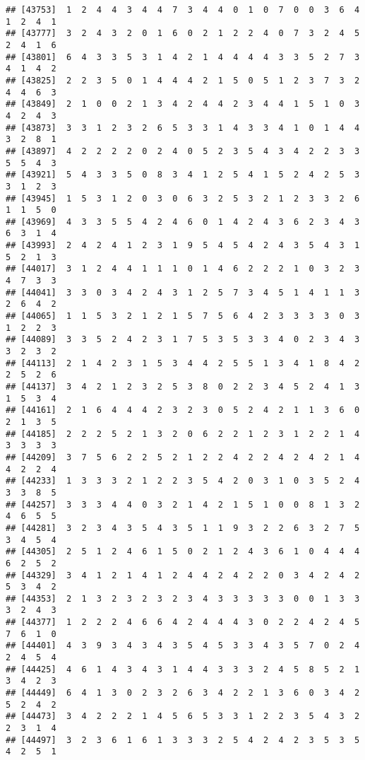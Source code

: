 \documentclass[
]{article}
\begin{document}
\begin{verbatim}
## [43753]  1  2  4  4  3  4  4  7  3  4  4  0  1  0  7  0  0  3  6  4  1  2  4  1
## [43777]  3  2  4  3  2  0  1  6  0  2  1  2  2  4  0  7  3  2  4  5  2  4  1  6
## [43801]  6  4  3  3  5  3  1  4  2  1  4  4  4  4  3  3  5  2  7  3  4  1  4  2
## [43825]  2  2  3  5  0  1  4  4  4  2  1  5  0  5  1  2  3  7  3  2  4  4  6  3
## [43849]  2  1  0  0  2  1  3  4  2  4  4  2  3  4  4  1  5  1  0  3  4  2  4  3
## [43873]  3  3  1  2  3  2  6  5  3  3  1  4  3  3  4  1  0  1  4  4  3  2  8  1
## [43897]  4  2  2  2  2  0  2  4  0  5  2  3  5  4  3  4  2  2  3  3  5  5  4  3
## [43921]  5  4  3  3  5  0  8  3  4  1  2  5  4  1  5  2  4  2  5  3  3  1  2  3
## [43945]  1  5  3  1  2  0  3  0  6  3  2  5  3  2  1  2  3  3  2  6  1  1  5  0
## [43969]  4  3  3  5  5  4  2  4  6  0  1  4  2  4  3  6  2  3  4  3  6  3  1  4
## [43993]  2  4  2  4  1  2  3  1  9  5  4  5  4  2  4  3  5  4  3  1  5  2  1  3
## [44017]  3  1  2  4  4  1  1  1  0  1  4  6  2  2  2  1  0  3  2  3  4  7  3  3
## [44041]  3  3  0  3  4  2  4  3  1  2  5  7  3  4  5  1  4  1  1  3  2  6  4  2
## [44065]  1  1  5  3  2  1  2  1  5  7  5  6  4  2  3  3  3  3  0  3  1  2  2  3
## [44089]  3  3  5  2  4  2  3  1  7  5  3  5  3  3  4  0  2  3  4  3  3  2  3  2
## [44113]  2  1  4  2  3  1  5  3  4  4  2  5  5  1  3  4  1  8  4  2  2  5  2  6
## [44137]  3  4  2  1  2  3  2  5  3  8  0  2  2  3  4  5  2  4  1  3  1  5  3  4
## [44161]  2  1  6  4  4  4  2  3  2  3  0  5  2  4  2  1  1  3  6  0  2  1  3  5
## [44185]  2  2  2  5  2  1  3  2  0  6  2  2  1  2  3  1  2  2  1  4  3  3  3  3
## [44209]  3  7  5  6  2  2  5  2  1  2  2  4  2  2  4  2  4  2  1  4  4  2  2  4
## [44233]  1  3  3  3  2  1  2  2  3  5  4  2  0  3  1  0  3  5  2  4  3  3  8  5
## [44257]  3  3  3  4  4  0  3  2  1  4  2  1  5  1  0  0  8  1  3  2  4  6  5  5
## [44281]  3  2  3  4  3  5  4  3  5  1  1  9  3  2  2  6  3  2  7  5  3  4  5  4
## [44305]  2  5  1  2  4  6  1  5  0  2  1  2  4  3  6  1  0  4  4  4  6  2  5  2
## [44329]  3  4  1  2  1  4  1  2  4  4  2  4  2  2  0  3  4  2  4  2  5  3  4  2
## [44353]  2  1  3  2  3  2  3  2  3  4  3  3  3  3  3  0  0  1  3  3  3  2  4  3
## [44377]  1  2  2  2  4  6  6  4  2  4  4  4  3  0  2  2  4  2  4  5  7  6  1  0
## [44401]  4  3  9  3  4  3  4  3  5  4  5  3  3  4  3  5  7  0  2  4  2  4  5  4
## [44425]  4  6  1  4  3  4  3  1  4  4  3  3  3  2  4  5  8  5  2  1  3  4  2  3
## [44449]  6  4  1  3  0  2  3  2  6  3  4  2  2  1  3  6  0  3  4  2  5  2  4  2
## [44473]  3  4  2  2  2  1  4  5  6  5  3  3  1  2  2  3  5  4  3  2  2  3  1  4
## [44497]  3  2  3  6  1  6  1  3  3  3  2  5  4  2  4  2  3  5  3  5  4  2  5  1

\end{verbatim}
\end{document}
